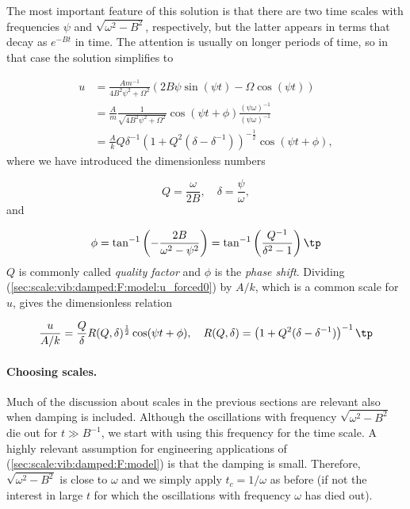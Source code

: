 \documentclass[graybox,envcountchap,sectrefs,final]{svmonodo}
\begin{document}

The most important feature of this solution is that there are
two time scales with frequencies $\psi$ and $\sqrt{\omega^2 - B^2}$,
respectively,
but the latter appears in terms that decay as $e^{-Bt}$ in time.
The attention is usually on longer periods of time, so in that
case the solution simplifies to

\begin{align}
u &= \frac{Am^{-1}}{4 B^{2} \psi^{2} +
\Omega^{2}} \left(2 B \psi
\sin{\left (\psi t \right )} - \Omega\cos{\left (\psi t \right )}\right)
\nonumber\\ 
&= \frac{A}{m}\frac{1}{\sqrt{4B^2\psi^2 + \Omega^2}}\cos(\psi t + \phi)
\frac{(\psi\omega)^{-1}}{(\psi\omega)^{-1}}
\nonumber\\ 
& = \frac{A}{k} Q\delta^{-1}\left(1 + Q^2(\delta - \delta^{-1})\right)^{-
\frac{1}{2}}\cos(\psi t + \phi),
\label{sec:scale:vib:damped:F:model:u_forced0}
\end{align}
where we have introduced the dimensionless numbers

\[ Q = \frac{\omega}{2B},\quad\delta = \frac{\psi}{\omega},\]
and

\[ \phi = \tan^{-1}\left(-\frac{2B}{\omega^2 - \psi^2}\right)
= \tan^{-1}\left(\frac{Q^{-1}}{\delta^2 - 1}\right)\tp\]
$Q$ is commonly called \emph{quality factor} and $\phi$ is the
\emph{phase shift}. Dividing
(\ref{sec:scale:vib:damped:F:model:u_forced0}) by $A/k$, which is a common
scale for $u$, gives the dimensionless relation

\begin{equation}
\frac{u}{A/k} = \frac{Q}{\delta} R(Q,\delta)^{\frac{1}{2}}\cos(\psi t + \phi),
\quad
R(Q,\delta) = \left(1 + Q^2(\delta - \delta^{-1})\right)^{-1}\tp
\label{sec:scale:vib:damped:F:model:u_forced}
\end{equation}


\paragraph{Choosing scales.}
Much of the discussion about scales in the previous sections are
relevant also when damping is included.  Although the oscillations
with frequency $\sqrt{\omega^2-B^2}$ die out for $t\gg B^{-1}$, we
start with using this frequency for the time scale.  A highly relevant
assumption for engineering applications of
(\ref{sec:scale:vib:damped:F:model}) is that the damping is small.
Therefore, $\sqrt{\omega^2-B^2}$ is close to $\omega$ and we simply
apply $t_c=1/\omega$ as before (if not the interest in large $t$ for
which the oscillations with frequency $\omega$ has died out).
\end{document}
